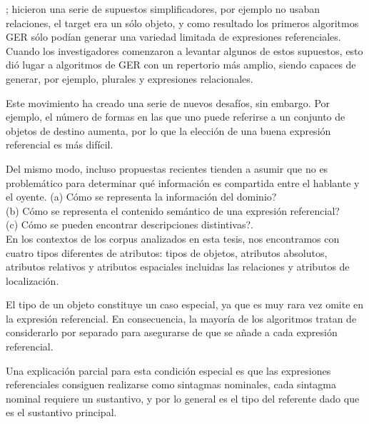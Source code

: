 \cite{C92-1038}; \cite{Dale95computationalinterpretations} hicieron una serie de supuestos simplificadores, por ejemplo no usaban relaciones, el target era un s\'olo objeto, y como resultado los primeros
algoritmos GER s\'olo pod\'ian generar una variedad limitada de expresiones referenciales. Cuando
los investigadores comenzaron a levantar algunos de estos supuestos, esto di\'o lugar a algoritmos de GER
con un repertorio m\'as amplio, siendo capaces de generar, por ejemplo, plurales y expresiones relacionales. 

Este movimiento ha creado una serie de nuevos desaf\'ios, sin embargo. Por ejemplo, el
n\'umero de formas en las que uno puede referirse a un conjunto de objetos de destino aumenta, por lo que la elecci\'on de una
buena expresi\'on referencial es m\'as dif\'icil.

Del mismo modo, incluso propuestas recientes tienden a asumir que no es problem\'atico para determinar qu\'e informaci\'on
es compartida entre el hablante y el oyente.
(a) C\'omo se representa la informaci\'on del dominio?\\
(b) C\'omo se representa el contenido sem\'antico de una expresi\'on referencial? \\
(c) C\'omo se pueden encontrar descripciones distintivas?.\\

 En los contextos de los corpus analizados en esta tesis, nos encontramos con cuatro tipos diferentes de atributos:
tipos de objetos, atributos absolutos, atributos relativos y atributos espaciales incluidas las relaciones y atributos de localizaci\'on.

El tipo de un objeto constituye un caso especial, ya que es muy rara vez omite
en la expresi\'on referencial. En consecuencia, la mayor\'ia de los algoritmos tratan de
considerarlo por separado para asegurarse de que se a\~nade a cada expresi\'on referencial. 

Una explicaci\'on parcial para esta condici\'on especial es que las expresiones referenciales consiguen realizarse como sintagmas nominales,
cada sintagma nominal requiere un sustantivo, y por lo general es el tipo del referente dado que es el sustantivo principal.

